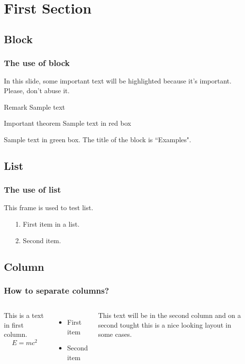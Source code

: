 \section{First Section}
\subsection{Block}
\begin{frame}
    \frametitle{The use of block}
    In this slide, some important text will be
    \alert{highlighted} because it's important.
    Please, don't abuse it.
    \begin{block}{Remark}
    Sample text
    \end{block}
    
    \begin{alertblock}{Important theorem}
    Sample text in red box
    \end{alertblock}
    
    \begin{examples}
    Sample text in green box. The title of the block is ``Examples".
    \end{examples}
\end{frame}

\subsection{List}
\begin{frame}
    \frametitle{The use of list}
    This frame is used to test list.
    \begin{itemize}
        \item[1.] First item in a list.
        \item[2.] Second item.
    \end{itemize}
\end{frame}

\subsection{Column}
\begin{frame}
    \frametitle{How to separate columns?}
    \begin{columns}

        This is a text in first column.
        $$E=mc^2$$
        \begin{itemize}
        \item First item
        \item Second item
        \end{itemize}
        
        This text will be in the second column
        and on a second tought this is a nice looking
        layout in some cases.
        \end{columns}
\end{frame}